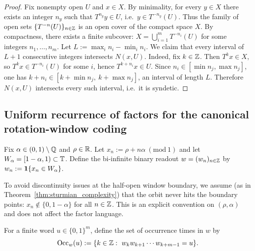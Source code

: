 \begin{proof}
Fix nonempty open $U$ and $x\in X$.
By minimality, for every $y\in X$ there exists an integer $n_y$ such that $T^{n_y}y\in U$, i.e.\ $y\in T^{-n_y}(U)$.
Thus the family of open sets $\{T^{-n}(U)\}_{n\in\mathbb{Z}}$ is an open cover of the compact space $X$.
By compactness, there exists a finite subcover: $X=\bigcup_{i=1}^m T^{-n_i}(U)$ for some integers $n_1,\ldots,n_m$.
Let $L:=\max_i n_i-\min_i n_i$.
We claim that every interval of $L+1$ consecutive integers intersects $N(x,U)$.
Indeed, fix $k\in\mathbb{Z}$.
Then $T^k x\in X$, so $T^k x\in T^{-n_i}(U)$ for some $i$, hence $T^{k+n_i}x\in U$.
Since $n_i\in[\min n_j,\max n_j]$, one has $k+n_i\in[k+\min n_j,\ k+\max n_j]$, an interval of length $L$.
Therefore $N(x,U)$ intersects every such interval, i.e.\ it is syndetic.
\end{proof}

\subsection{Uniform recurrence of factors for the canonical rotation-window coding}
\label{subsec:sturmian_uniform_recurrence_proof}

\begin{definition}\label{def:canonical_rotation_window_coding}
\MathTag Fix $\alpha\in(0,1)\setminus\mathbb{Q}$ and $\rho\in\mathbb{R}$.
Let $x_n:=\rho+n\alpha\ (\mathrm{mod}\ 1)$ and let $W_\alpha=[1-\alpha,1)\subset\mathbb{T}$.
Define the bi-infinite binary readout $w=(w_n)_{n\in\mathbb{Z}}$ by $w_n:=\mathbf{1}\{x_n\in W_\alpha\}$.
\end{definition}

\begin{remark}\label{rem:sturmian_boundary_avoidance}
\AuditTag To avoid discontinuity issues at the half-open window boundary, we assume (as in Theorem~\ref{thm:sturmian_complexity}) that the orbit never hits the boundary points:
$x_n\notin\{0,1-\alpha\}$ for all $n\in\mathbb{Z}$.
This is an explicit convention on $(\rho,\alpha)$ and does not affect the factor language.
\end{remark}

\begin{definition}\label{def:factor_occurrence_times}
\MathTag For a finite word $u\in\{0,1\}^m$, define the set of occurrence times in $w$ by
\[
\mathrm{Occ}_w(u):=\{k\in\mathbb{Z}:\ w_k w_{k+1}\cdots w_{k+m-1}=u\}.
\]
\end{definition}

